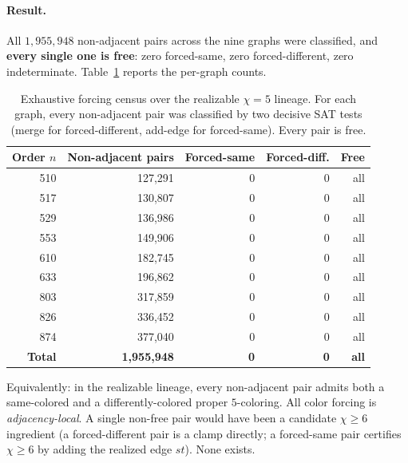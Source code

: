 \documentclass[11pt]{article}
\theoremstyle{definition}
\newcommand{\chrom}{\chi}
\begin{document}
\paragraph{Result.} All $1{,}955{,}948$ non-adjacent pairs across the nine graphs
were classified, and \textbf{every single one is free}: zero forced-same, zero
forced-different, zero indeterminate. Table~\ref{tab:census} reports the
per-graph counts.

\begin{table}[ht]
\centering
\caption{Exhaustive forcing census over the realizable $\chrom = 5$ lineage. For
each graph, every non-adjacent pair was classified by two decisive SAT tests
(merge for forced-different, add-edge for forced-same). Every pair is free.}
\label{tab:census}
\begin{tabular}{r r r r r}
\toprule
Order $n$ & Non-adjacent pairs & Forced-same & Forced-diff. & Free \\
\midrule
510 & 127{,}291 & 0 & 0 & all \\
517 & 130{,}807 & 0 & 0 & all \\
529 & 136{,}986 & 0 & 0 & all \\
553 & 149{,}906 & 0 & 0 & all \\
610 & 182{,}745 & 0 & 0 & all \\
633 & 196{,}862 & 0 & 0 & all \\
803 & 317{,}859 & 0 & 0 & all \\
826 & 336{,}452 & 0 & 0 & all \\
874 & 377{,}040 & 0 & 0 & all \\
\midrule
\textbf{Total} & \textbf{1{,}955{,}948} & \textbf{0} & \textbf{0} &
  \textbf{all} \\
\bottomrule
\end{tabular}
\end{table}


Equivalently: in the realizable lineage, every non-adjacent pair admits both a
same-colored and a differently-colored proper $5$-coloring. All color forcing is
\emph{adjacency-local}. A single non-free pair would have been a candidate
$\chrom \ge 6$ ingredient (a forced-different pair is a clamp directly; a
forced-same pair certifies $\chrom \ge 6$ by adding the realized edge $st$). None
exists.
\end{document}
